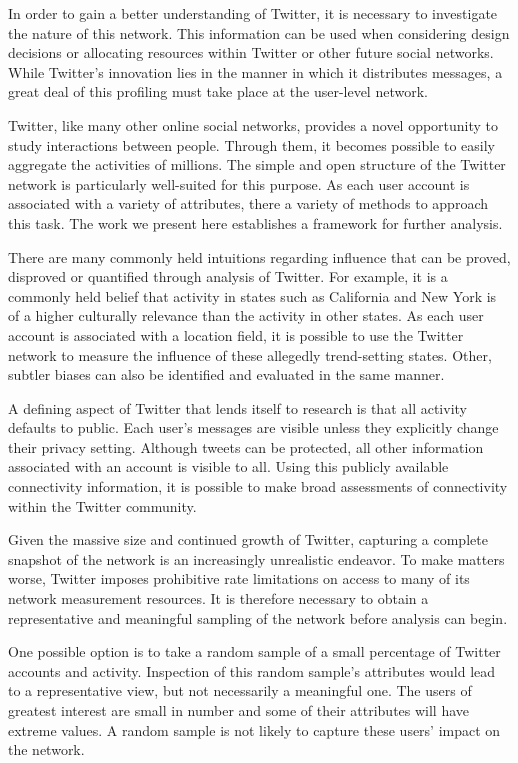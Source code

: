 In order to gain a better understanding of Twitter, it is necessary to investigate the nature of this network.  This information can be used when considering design 
decisions or allocating resources within Twitter or other future social networks.  While Twitter's innovation lies in the manner in which it distributes messages, a 
great deal of this profiling must take place at the user-level network.

Twitter, like many other online social networks, provides a novel opportunity to study interactions between people.  Through them, it becomes possible to easily aggregate 
the activities of millions.  The simple and open structure of the Twitter network is particularly well-suited for this purpose.  As each user account is associated with 
a variety of attributes, there a variety of methods to approach this task.  The work we present here establishes a framework for further analysis.

There are many commonly held intuitions regarding influence that can be proved, disproved or quantified through analysis of Twitter.  For example, it is a commonly held 
belief that activity in states such as California and New York is of a higher culturally relevance than the activity in other states.  As each user account is associated 
with a location field, it is possible to use the Twitter network to measure the influence of these allegedly trend-setting states.  Other, subtler biases can also be 
identified and evaluated in the same manner.

A defining aspect of Twitter that lends itself to research is that all activity defaults to public.  Each user's messages are visible unless they explicitly change their 
privacy setting.  Although tweets can be protected, all other information associated with an account is visible to all.  Using this publicly available connectivity 
information, it is possible to make broad assessments of connectivity within the Twitter community.

Given the massive size and continued growth of Twitter, capturing a complete snapshot of the network is an increasingly unrealistic endeavor.  To make matters worse, 
Twitter imposes prohibitive rate limitations on access to many of its network measurement resources.  It is therefore necessary to obtain a representative and meaningful 
sampling of the network before analysis can begin.

One possible option is to take a random sample of a small percentage of Twitter accounts and activity.  Inspection of this random sample's attributes would lead to a 
representative view, but not necessarily a meaningful one.  The users of greatest interest are small in number and some of their attributes will have extreme values.  A 
random sample is not likely to capture these users' impact on the network.

